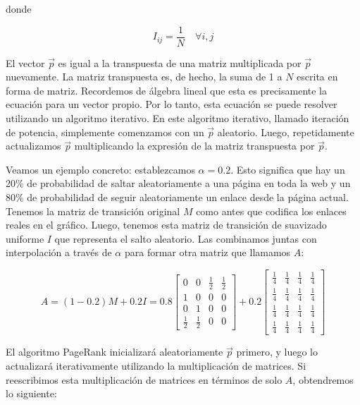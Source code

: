 donde 

\begin{equation}
I_{ij} = \frac{1}{N} \quad \forall i, j
\end{equation}

El vector $\vec{p}$ es igual a la transpuesta de una matriz multiplicada por $\vec{p}$ nuevamente. La matriz transpuesta es, de hecho, la suma de 1 a $N$ escrita en forma de matriz. Recordemos de álgebra lineal que esta es precisamente la ecuación para un vector propio. Por lo tanto, esta ecuación se puede resolver utilizando un algoritmo iterativo. En este algoritmo iterativo, llamado iteración de potencia, simplemente comenzamos con un $\vec{p}$ aleatorio. Luego, repetidamente actualizamos $\vec{p}$ multiplicando la expresión de la matriz transpuesta por $\vec{p}$.

Veamos un ejemplo concreto: establezcamos $\alpha = 0.2$. Esto significa que hay un 20\% de probabilidad de saltar aleatoriamente a una página en toda la web y un 80\% de probabilidad de seguir aleatoriamente un enlace desde la página actual. Tenemos la matriz de transición original $M$ como antes que codifica los enlaces reales en el gráfico. Luego, tenemos esta matriz de transición de suavizado uniforme $I$ que representa el salto aleatorio. Las combinamos juntas con interpolación a través de $\alpha$ para formar otra matriz que llamamos $A$:

\begin{equation}
A = (1 - 0.2) M + 0.2 I = 0.8 
\begin{bmatrix}
0 & 0 & \frac{1}{2} & \frac{1}{2} \\
1 & 0 & 0 & 0 \\
0 & 1 & 0 & 0 \\
\frac{1}{2} & \frac{1}{2} & 0 & 0
\end{bmatrix}
+ 0.2 
\begin{bmatrix}
\frac{1}{4} & \frac{1}{4} & \frac{1}{4} & \frac{1}{4} \\
\frac{1}{4} & \frac{1}{4} & \frac{1}{4} & \frac{1}{4} \\
\frac{1}{4} & \frac{1}{4} & \frac{1}{4} & \frac{1}{4} \\
\frac{1}{4} & \frac{1}{4} & \frac{1}{4} & \frac{1}{4}
\end{bmatrix}
\end{equation}

El algoritmo PageRank inicializará aleatoriamente \(\vec{p}\) primero, y luego lo actualizará iterativamente utilizando la multiplicación de matrices. Si reescribimos esta multiplicación de matrices en términos de solo \(A\), obtendremos lo siguiente:

